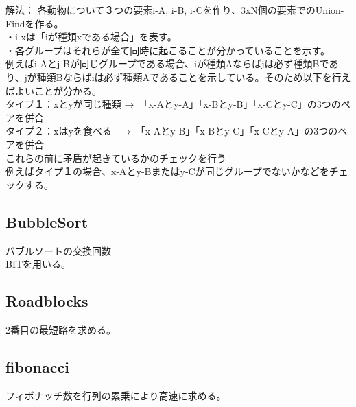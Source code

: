 解法：
各動物について３つの要素i-A, i-B, i-Cを作り、3xN個の要素でのUnion-Findを作る。\\
・i-xは「iが種類xである場合」を表す。\\
・各グループはそれらが全て同時に起こることが分かっていることを示す。\\

例えばi-Aとj-Bが同じグループである場合、iが種類Aならばjは必ず種類Bであり、jが種類Bならばiは必ず種類Aであることを示している。そのため以下を行えばよいことが分かる。\\
タイプ１：xとyが同じ種類 →　「x-Aとy-A」「x-Bとy-B」「x-Cとy-C」の3つのペアを併合\\
タイプ２：xはyを食べる　→　「x-Aとy-B」「x-Bとy-C」「x-Cとy-A」の3つのペアを併合\\
これらの前に矛盾が起きているかのチェックを行う\\
例えばタイプ１の場合、x-Aとy-Bまたはy-Cが同じグループでないかなどをチェックする。\\





\subsection{BubbleSort}
バブルソートの交換回数\\
BITを用いる。


\subsection{Roadblocks}
2番目の最短路を求める。


\subsection{fibonacci}
フィボナッチ数を行列の累乗により高速に求める。



